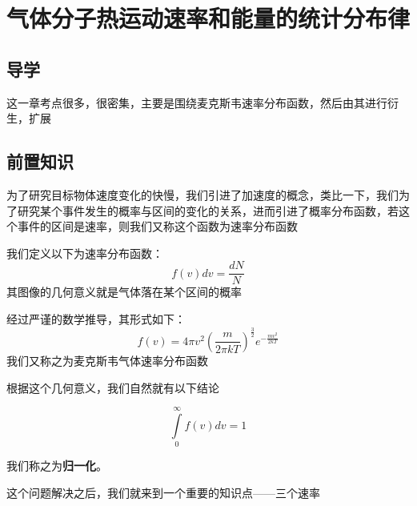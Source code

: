 \documentclass[lang=cn,10pt]{elegantbook}
\begin{document}
	\chapter{气体分子热运动速率和能量的统计分布律}
	\section{导学}
	这一章考点很多，很密集，主要是围绕麦克斯韦速率分布函数，然后由其进行衍生，扩展
	\section{前置知识}
	
	 为了研究目标物体速度变化的快慢，我们引进了加速度的概念，类比一下，我们为了研究某个事件发生的概率与区间的变化的关系，进而引进了概率分布函数，若这个事件的区间是速率，则我们又称这个函数为速率分布函数
	 
	 \begin{definition}[速率分布函数]
	 	我们定义以下为速率分布函数：
	 	\begin{equation*}
	 		f\left( v \right) dv=\frac{dN}{N}
	 	\end{equation*}
	 	其图像的几何意义就是气体落在某个区间的概率
	 	
	 	经过严谨的数学推导，其形式如下：
	 	\begin{equation*}
	 		f\left( v \right) =4\pi v^2\left( \frac{m}{2\pi kT} \right) ^{\frac{3}{2}}e^{-\frac{mv^2}{2kT}}
	 	\end{equation*}我们又称之为麦克斯韦气体速率分布函数
	 \end{definition}
	 
	 根据这个几何意义，我们自然就有以下结论
	 
	 \begin{conclusion}
	 	\begin{equation*}
	 		\int\limits_0^{\infty}{f\left( v \right) dv}=1
	 	\end{equation*}
	 \end{conclusion}
	 我们称之为\textbf{归一化}。
	 
	 这个问题解决之后，我们就来到一个重要的知识点——三个速率
	 
\end{document}
